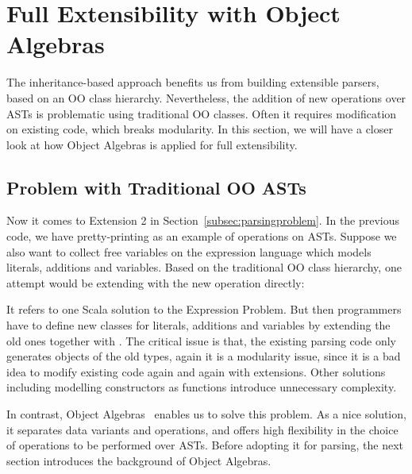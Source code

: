 \section{Full Extensibility with Object Algebras}\label{sec:algebrasandparsing}

The inheritance-based approach benefits us from building extensible parsers, based on an OO class hierarchy.
Nevertheless, the addition of new operations over ASTs is problematic using traditional OO classes. Often it requires modification on existing code, which breaks modularity. In this section, we will have a closer look at how Object Algebras is applied for full extensibility.

\subsection{Problem with Traditional OO ASTs}\label{subsec:problemwithoutoa}

Now it comes to Extension 2 in Section~\ref{subsec:parsingproblem}. In the previous code, we have pretty-printing as
an example of operations on ASTs. Suppose we also want to collect free variables on the expression language which models
literals, additions and variables. Based on the traditional OO class hierarchy, one attempt would be extending  with the new
operation directly:


It refers to one Scala solution to the Expression Problem. But then programmers have to define new classes for literals, additions and variables
by extending the old ones together with . The critical issue is that, the existing parsing code only generates objects of the old
types, again it is a modularity issue, since it is a bad idea to modify existing code again and again with extensions. Other solutions including modelling constructors as functions introduce unnecessary complexity.

In contrast, Object Algebras~\cite{Oliveira2012} enables us to solve this problem. As a nice solution, it separates data variants
and operations, and offers high flexibility in the choice of operations to be performed over ASTs. Before adopting it for parsing, the next section introduces the background of Object Algebras.

